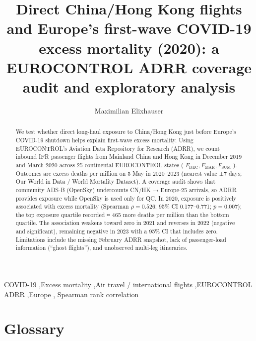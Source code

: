 \documentclass[
  authoryear,
  preprint,
  3p,
  onecolumn]{elsarticle}
\begin{document}
\begin{frontmatter}
\title{Direct China/Hong Kong flights and Europe's first-wave COVID-19
excess mortality (2020): a EUROCONTROL ADRR coverage audit and
exploratory analysis}
\author[1]{Maximilian Elixhauser%
%
}



        
\begin{abstract}
We test whether direct long-haul exposure to China/Hong Kong just before
Europe's COVID-19 shutdown helps explain first-wave excess mortality.
Using EUROCONTROL's Aviation Data Repository for Research (ADRR), we
count inbound IFR passenger flights from Mainland China and Hong Kong in
December 2019 and March 2020 across 25 continental EUROCONTROL states (
\(F_{\text{DEC}}, F_{\text{MAR}}, F_{\text{SUM}}\) ). Outcomes are
excess deaths per million on 5 May in 2020--2023 (nearest value ±7 days;
Our World in Data / World Mortality Dataset). A coverage audit shows
that community ADS-B (OpenSky) undercounts CN/HK → Europe-25 arrivals,
so ADRR provides exposure while OpenSky is used only for QC. In 2020,
exposure is positively associated with excess mortality (Spearman
\(\rho = 0.526\); 95\% CI 0.177--0.771; \(p = 0.007\)); the top exposure
quartile recorded ≈ 465 more deaths per million than the bottom
quartile. The association weakens toward zero in 2021 and reverses in
2022 (negative and significant), remaining negative in 2023 with a 95\%
CI that includes zero. Limitations include the missing February ADRR
snapshot, lack of passenger-load information (``ghost flights''), and
unobserved multi-leg itineraries.
\end{abstract}





\begin{keyword}
    COVID‑19 \sep Excess mortality \sep Air travel / international
flights \sep EUROCONTROL ADRR \sep Europe \sep 
    Spearman rank correlation
\end{keyword}
\end{frontmatter}
    

\clearpage

\section{Glossary}\label{glossary}
\end{document}
